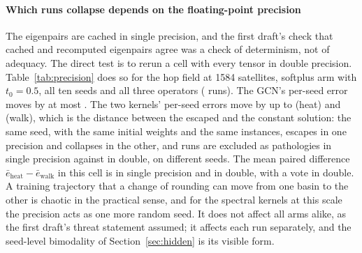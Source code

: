 \documentclass[preprint,11pt,3p]{elsarticle}
\begin{document}
\paragraph{Which runs collapse depends on the floating-point precision}
The eigenpairs are cached in single precision, and the first draft's check that cached and
recomputed eigenpairs agree was a check of determinism, not of adequacy. The direct test is to
rerun a cell with every tensor in double precision. Table~\ref{tab:precision} does so for the
hop field at 1584 satellites, softplus arm with $t_{0}=0.5$, all ten seeds and all three
operators (\numPrecRuns{} runs). The GCN's per-seed error moves by at most
\numPrecGcnDelta{}. The two kernels' per-seed errors move by up to \numPrecHeatDelta{} (heat)
and \numPrecWalkDelta{} (walk), which is the distance between the escaped and the constant
solution: the same seed, with the same initial weights and the same instances, escapes in one
precision and collapses in the other, and \numPrecPathologyThirtyTwo{} runs are excluded as
pathologies in single precision against \numPrecPathologySixtyFour{} in double, on different
seeds. The mean paired difference $\bar e_{\mathrm{heat}}-\bar e_{\mathrm{walk}}$ in this cell is
\numPrecDiffThirtyTwo{} in single precision and \numPrecDiffSixtyFour{} in double, with a
\numPrecWinsSixtyFour{} vote in double. A training trajectory that a change of rounding can move
from one basin to the other is chaotic in the practical sense, and for the spectral kernels at
this scale the precision acts as one more random seed. It does not affect all arms alike, as the
first draft's threat statement assumed; it affects each run separately, and the seed-level
bimodality of Section~\ref{sec:hidden} is its visible form.
\end{document}
